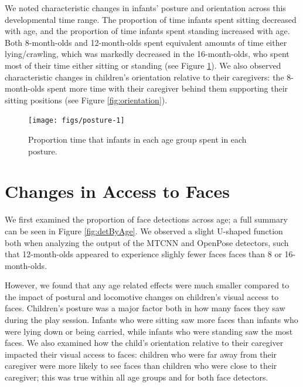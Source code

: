 \documentclass[10pt, letterpaper]{article}
\newenvironment{CodeChunk}{}{}
\begin{document}
We noted characteristic changes in infants' posture and orientation
across this developmental time range. The proportion of time infants
spent sitting decreased with age, and the proportion of time infants
spent standing increased with age. Both 8-month-olds and 12-month-olds
spent equivalent amounts of time either lying/crawling, which was
markedly decreased in the 16-month-olds, who spent most of their time
either sitting or standing (see Figure \ref{fig:posture}). We also
observed characteristic changes in children's orientation relative to
their caregivers: the 8-month-olds spent more time with their caregiver
behind them supporting their sitting positions (see Figure
\ref{fig:orientation}).

\begin{CodeChunk}
\begin{figure}[h]

{\centering \texttt{[image: figs/posture-1]} 

}

\caption[Proportion time that infants in each age group spent in each posture]{Proportion time that infants in each age group spent in each posture.}\label{fig:posture}
\end{figure}
\end{CodeChunk}

\section{Changes in Access to Faces}\label{changes-in-access-to-faces}

We first examined the proportion of face detections across age; a full
summary can be seen in Figure \ref{fig:detByAge}. We observed a slight
U-shaped function both when analyzing the output of the MTCNN and
OpenPose detectors, such that 12-month-olds appeared to experience
slighly fewer faces faces than 8 or 16-month-olds.

However, we found that any age related effects were much smaller
compared to the impact of postural and locomotive changes on children's
visual access to faces. Children's posture was a major factor both in
how many faces they saw during the play session. Infants who were
sitting saw more faces than infants who were lying down or being
carried, while infants who were standing saw the most faces. We also
examined how the child's orientation relative to their caregiver
impacted their visual access to faces: children who were far away from
their caregiver were more likely to see faces than children who were
close to their caregiver; this was true within all age groups and for
both face detectors.
\end{document}
